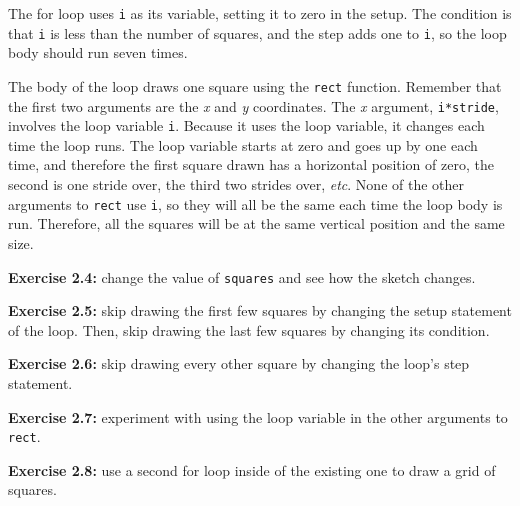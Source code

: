 \documentclass[
]{leaflet}
\begin{document}
The for loop uses \texttt{i} as its variable, setting it to zero in the setup.
The condition is that \texttt{i} is less than the number of squares, and the step adds one to \texttt{i}, so the loop body should run seven times.

The body of the loop draws one square using the \texttt{rect} function.
Remember that the first two arguments are the \textit{x} and \textit{y} coordinates.
The \textit{x} argument, \texttt{i*stride}, involves the loop variable \texttt{i}.
Because it uses the loop variable, it changes each time the loop runs.
The loop variable starts at zero and goes up by one each time, and therefore the first square drawn has a horizontal position of zero, the second is one stride over, the third two strides over, \textit{etc}.
None of the other arguments to \texttt{rect} use \texttt{i}, so they will all be the same each time the loop body is run.
Therefore, all the squares will be at the same vertical position and the same size.

\textbf{Exercise 2.4:} change the value of \texttt{squares} and see how the sketch changes.

\textbf{Exercise 2.5:} skip drawing the first few squares by changing the setup statement of the loop.
Then, skip drawing the last few squares by changing its condition.

\textbf{Exercise 2.6:} skip drawing every other square by changing the loop's step statement.

\textbf{Exercise 2.7:} experiment with using the loop variable in the other arguments to \texttt{rect}.

\textbf{Exercise 2.8:} use a second for loop inside of the existing one to draw a grid of squares.


\loggingall
\end{document}
